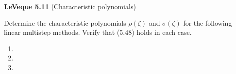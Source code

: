 \textbf{LeVeque 5.11}  (Characteristic polynomials)

Determine the characteristic polynomials $\rho(\zeta)$ and $\sigma(\zeta)$ for the following linear multistep methods.
Verify that (5.48) holds in each case.

\begin{enumerate}
  \item 
  \pagebreak
  \item 
  \pagebreak
  \item 
\end{enumerate} 